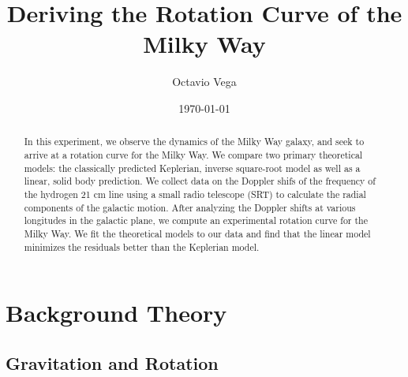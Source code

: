 \documentclass[aps,twocolumn,secnumarabic,balancelastpage,amsmath,amssymb,nofootinbib, floatfix]{revtex4-2}
\begin{document}
	\title{Deriving the Rotation Curve of the Milky Way}
	\author{Octavio Vega}
	\date{\today}
	
	\begin{abstract}
		In this experiment, we observe the dynamics of the Milky Way galaxy, and seek to arrive at a rotation curve for the Milky Way. We compare two primary theoretical models: the classically predicted Keplerian, inverse square-root model as well as a linear, solid body prediction. We collect data on the Doppler shifs of the frequency of the hydrogen 21 cm line using a small radio telescope (SRT) to calculate the radial components of the galactic motion. After analyzing the Doppler shifts at various longitudes in the galactic plane, we compute an experimental rotation curve for the Milky Way. We fit the theoretical models to our data and find that the linear model minimizes the residuals better than the Keplerian model. 
	\end{abstract}
	
	\maketitle
	
	
	\section{Background Theory}
	
	\subsection{Gravitation and Rotation}
	
\end{document}
